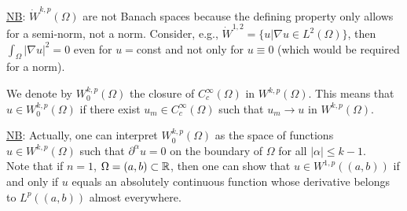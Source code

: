 \documentclass[11pt]{article}
\begin{document}
		\noindent\underline{NB}: $\dot{W}^{k,p}(\Omega)$ are not Banach spaces because the defining property only allows for a semi-norm, not a norm. Consider, e.g., $\dot{W}^{1,2}=\{u|\nabla u\in L^2(\Omega)\}$, then $\int_\Omega|\nabla u|^2=0$ even for $u=$const and not only for $u\equiv0$ (which would be required for a norm).

		\begin{defi}\label{def--closure}
			We denote by $W^{k,p}_0(\Omega)$ the closure of $C^\infty_c(\Omega)$ in $W^{k,p}(\Omega)$. This means that $u\in W^{k,p}_0(\Omega)$ if there exist $u_m\in C^\infty_c(\Omega)$ such that $u_m\to u$ in $W^{k,p}(\Omega)$.
		\end{defi}

		\noindent\underline{NB}: Actually, one can interpret $W^{k,p}_0(\Omega)$ as the space of functions $u\in W^{k,p}(\Omega)$ such that $\partial^\alpha u=0$ on the boundary of $\Omega$ for all $|\alpha|\le k-1$.
		\\

		\noindent Note that if $n=1$, $\Omega=(a,b)\subset\mathbb{R}$, then one can show that $u\in W^{1,p}((a,b))$ if and only if $u$ equals an absolutely continuous function whose derivative belongs to $L^p((a,b))$ almost everywhere.
\end{document}
